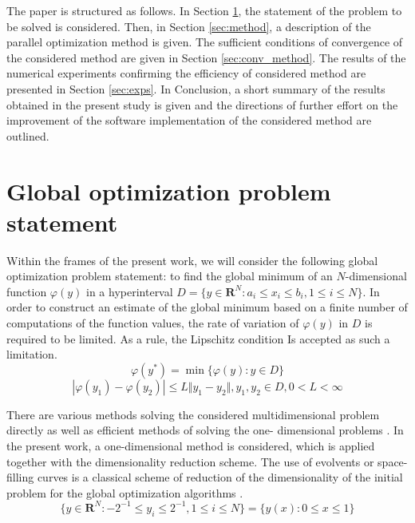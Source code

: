 \documentclass[runningheads]{llncs}
\begin{document}
The paper is structured as follows. In Section \ref{sec:problem}, the statement of the problem to
be solved is considered. Then, in Section \ref{sec:method}, a description of the parallel
optimization method is given. The sufficient conditions of convergence of the considered
method are given in Section \ref{sec:conv_method}.
The results of the numerical experiments confirming the efficiency of considered method are
presented in Section \ref{sec:exps}.
In Conclusion, a short summary of the results obtained in the present study is given and the
directions of further effort on the improvement of the software implementation of the
considered method are outlined.


\section{Global optimization problem statement}
\label{sec:problem}
Within the frames of the present work, we will consider the following global optimization
problem statement: to find the global minimum of an \(N\)-dimensional function \(\varphi(y)\) in
a hyperinterval
\(D=\{y\in \mathbf{R}^N:a_i\leqslant x_i\leqslant{b_i}, 1\leqslant{i}\leqslant{N}\}\).
In order to construct an estimate of the global minimum based on a finite number of
computations of the function values, the rate of variation of \(\varphi(y)\) in \(D\) is required to
be limited.
As a rule, the Lipschitz condition Is accepted as such a limitation.
\begin{equation}
\label{eq:task}
\varphi(y^*)=\min\{\varphi(y):y\in D\}
\end{equation}
\begin{displaymath}
\label{lip}
|\varphi(y_1)-\varphi(y_2)|\leqslant L\Vert y_1-y_2\Vert,y_1,y_2\in D,0<L<\infty
\end{displaymath}

There are various methods solving the considered multidimensional problem directly
\cite{SergeyevKvasov2017, Jones2009} as well as efficient methods of solving the one-
dimensional problems \cite{Norkin1992, Strongin2000}.
In the present work, a one-dimensional method is considered, which is applied together with the
dimensionality reduction scheme.
The use of evolvents or space-filling curves is a classical scheme of reduction of the
dimensionality of the initial problem for the global optimization algorithms
\cite{Sergeyev2013}.
\begin{equation}
\label{cube}
\lbrace y\in \mathbf{R}^N:-2^{-1}\leqslant y_i\leqslant 2^{-1},1\leqslant i\leqslant
N\rbrace=\{y(x):0\leqslant x\leqslant 1\}
\end{equation}
\end{document}
